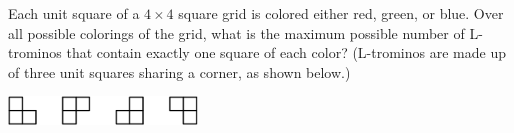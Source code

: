 Each unit square of a $4 \times 4$ square grid is colored either red, green, or blue. Over all possible colorings of the grid, what is the maximum possible number of L-trominos that contain exactly one square of each color? (L-trominos are made up of three unit squares sharing a corner, as shown below.)

\begin{center}
\includegraphics[width = 50.400000000000006mm]{img/fig0.png}
\end{center}

